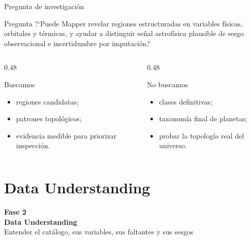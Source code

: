 \documentclass[aspectratio=169,10pt]{beamer}
\newcommand{\phasebox}[3]{
  \begin{center}
    \vspace{1.2em}
    {\Large\textbf{#1}}\\[0.5em]
    {\huge\textbf{#2}}\\[0.8em]
    {\large #3}
  \end{center}
}
\begin{document}
\begin{frame}{Pregunta de investigaci\'on}
  \begin{block}{Pregunta}
    ?`Puede Mapper revelar regiones estructuradas en variables f\'isicas, orbitales y t\'ermicas, y ayudar a distinguir se\~nal astrof\'isica plausible de sesgo observacional e incertidumbre por imputaci\'on?
  \end{block}

  \begin{columns}[T,onlytextwidth]
    \begin{column}{0.48\textwidth}
      \begin{block}{Buscamos}
        \begin{itemize}
          \item regiones candidatas;
          \item patrones topol\'ogicos;
          \item evidencia medible para priorizar inspecci\'on.
        \end{itemize}
      \end{block}
    \end{column}
    \begin{column}{0.48\textwidth}
      \begin{alertblock}{No buscamos}
        \begin{itemize}
          \item clases definitivas;
          \item taxonom\'ia final de planetas;
          \item probar la topolog\'ia real del universo.
        \end{itemize}
      \end{alertblock}
    \end{column}
  \end{columns}
\end{frame}

\section{Data Understanding}

\begin{frame}[plain]
  \phasebox{Fase 2}{Data Understanding}{Entender el cat\'alogo, sus variables, sus faltantes y sus sesgos}
\end{frame}
\end{document}
